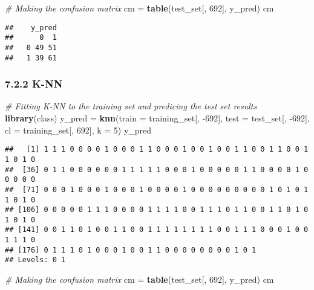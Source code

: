 \documentclass[]{article}
\newenvironment{Shaded}{\begin{snugshade}}{\end{snugshade}}
\newcommand{\CommentTok}[1]{\textcolor[rgb]{0.56,0.35,0.01}{\textit{#1}}}
\newcommand{\DataTypeTok}[1]{\textcolor[rgb]{0.13,0.29,0.53}{#1}}
\newcommand{\DecValTok}[1]{\textcolor[rgb]{0.00,0.00,0.81}{#1}}
\newcommand{\KeywordTok}[1]{\textcolor[rgb]{0.13,0.29,0.53}{\textbf{#1}}}
\newcommand{\NormalTok}[1]{#1}
\newcommand{\StringTok}[1]{\textcolor[rgb]{0.31,0.60,0.02}{#1}}
\begin{document}
\begin{Shaded}
\begin{Highlighting}[]
\CommentTok{# Making the confusion matrix}
\NormalTok{cm =}\StringTok{ }\KeywordTok{table}\NormalTok{(test_set[, }\DecValTok{692}\NormalTok{], y_pred)}
\NormalTok{cm}
\end{Highlighting}
\end{Shaded}

\begin{verbatim}
##    y_pred
##      0  1
##   0 49 51
##   1 39 61
\end{verbatim}

\hypertarget{k-nn}{%
\subsubsection{7.2.2 K-NN}\label{k-nn}}

\begin{Shaded}
\begin{Highlighting}[]
\CommentTok{# Fitting K-NN to the training set and predicing the test set results}
\KeywordTok{library}\NormalTok{(class)}
\NormalTok{y_pred =}\StringTok{ }\KeywordTok{knn}\NormalTok{(}\DataTypeTok{train =}\NormalTok{ training_set[, }\DecValTok{-692}\NormalTok{], }
             \DataTypeTok{test =}\NormalTok{ test_set[, }\DecValTok{-692}\NormalTok{], }
             \DataTypeTok{cl =}\NormalTok{ training_set[, }\DecValTok{692}\NormalTok{], }
             \DataTypeTok{k =} \DecValTok{5}\NormalTok{)}
\NormalTok{y_pred}
\end{Highlighting}
\end{Shaded}

\begin{verbatim}
##   [1] 1 1 1 0 0 0 0 1 0 0 0 1 1 0 0 0 1 0 0 1 0 0 1 1 0 0 1 1 0 0 1 1 0 1 0
##  [36] 0 1 1 0 0 0 0 0 0 1 1 1 1 1 0 0 0 1 0 0 0 0 0 1 1 0 0 0 0 1 0 0 0 0 0
##  [71] 0 0 0 1 0 0 0 1 0 0 0 1 0 0 0 0 1 0 0 0 0 0 0 0 0 0 1 0 1 0 1 1 0 1 0
## [106] 0 0 0 0 0 1 1 1 0 0 0 0 1 1 1 1 0 0 1 1 1 0 1 1 0 0 1 1 0 1 0 1 0 1 0
## [141] 0 0 1 1 0 1 0 0 1 1 0 0 1 1 1 1 1 1 1 1 0 0 1 1 1 0 0 0 1 0 0 1 1 1 0
## [176] 0 1 1 1 0 1 0 0 0 1 0 0 1 1 0 0 0 0 0 0 0 0 1 0 1
## Levels: 0 1
\end{verbatim}

\begin{Shaded}
\begin{Highlighting}[]
\CommentTok{# Making the confusion matrix}
\NormalTok{cm =}\StringTok{ }\KeywordTok{table}\NormalTok{(test_set[, }\DecValTok{692}\NormalTok{], y_pred)}
\NormalTok{cm}
\end{Highlighting}
\end{Shaded}
\end{document}
